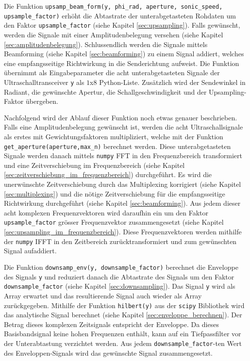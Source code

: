 Die Funktion \texttt{upsamp\_beam\_form(y, phi\_rad, aperture, sonic\_speed, upsample\_factor)} erhöht die Abtastrate der unterabgetasteten Rohdaten um den Faktor \texttt{upsample\_factor} (siehe Kapitel \ref{sec:upsampling}). Falls gewünscht, werden die Signale mit einer Amplitudenbelegung versehen (siehe Kapitel \ref{sec:amplitudenbelegung}). Schlussendlich werden die Signale mittels Beamforming (siehe Kapitel \ref{sec:beamforming}) zu einem Signal addiert, welches eine empfangsseitige Richtwirkung in die Senderichtung aufweist.
Die Funktion übernimmt als Eingabeparameter die acht unterabgetasteten Signale der Ultraschalltransceiver \texttt{y} als $1$x$8$ Python-Liste. Zusätzlich wird der Sendewinkel in Radiant, die gewünschte Apertur, die Schallgeschwindigkeit und der Upsampling-Faktor übergeben.

Nachfolgend wird der Ablauf dieser Funktion noch etwas genauer beschrieben. Falls eine Amplitudenbelegung gewünscht ist, werden die acht Ultraschallsignale als erstes mit Gewichtungsfaktoren multipliziert, welche mit der Funktion \texttt{get\_aperture(aperture,max\_n)} berechnet werden.
Diese unterabgetasteten Signale werden danach mittels \texttt{numpy} FFT in den Frequenzbereich transformiert und eine Zeitverschiebung im Frequenzbereich (siehe Kapitel \ref{sec:zeitverschiebung_im_frequenzbereich}) durchgeführt. Es wird die unerwünschte Zeitverschiebung durch das Multiplexing korrigiert (siehe Kapitel \ref{sec:multiplexing}) und die nötige Zeitverschiebung für die empfangsseitige Richtwirkung durchgeführt (siehe Kapitel \ref{sec:beamforming}).
Aus jedem dieser acht komplexen Frequenzvektoren wird daraufhin ein um den Faktor \texttt{upsample\_factor} grösser Frequenzvektor zusammengesetzt (siehe Kapitel \ref{sec:upsampling_im_frequenzbereich}). Diese Frequenzvektoren werden mithilfe der \texttt{numpy} IFFT in den Zeitbereich zurücktransformiert und zum gewünschten Signal aufaddiert.

Die Funktion \texttt{downsamp\_env(y, downsample\_factor)} berechnet die Enveloppe des Signals \texttt{y} und reduziert danach die Abtastrate des Signals um den Faktor \texttt{downsample\_factor} (siehe Kapitel \ref{sec:downsampling}). Das Signal \texttt{y} wird als Array erwartet und das resultierende Signal auch wieder als Array zurückgegeben.
Mithilfe der Funktion \texttt{hilbert(y)} aus der \texttt{scipy} Bibliothek wird das analytische Signal berechnet (siehe Kapitel \ref{sec:enveloppe_berechnen}). Der Betrag dieses komplexen Zeitsignals entspricht der Enveloppe. Da dieses Basisbandsignal keine hohen Frequenzen enthält, kann auf ein Tiefpassfilter vor der Unterabtastung verzichtet werden. Aus jedem \texttt{downsample\_factor}-ten Wert des Enveloppen-Signals wird das gewünschte Signal zusammengesetzt.

